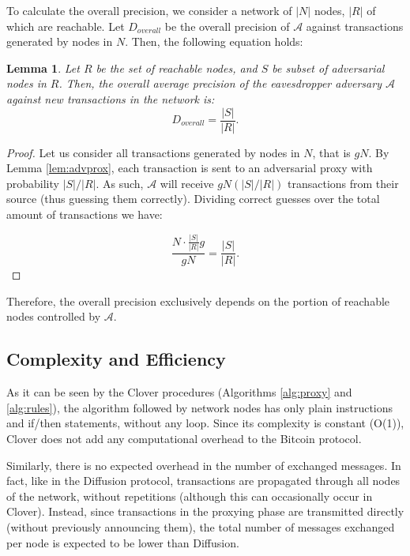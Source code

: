\documentclass{article}
\newtheorem{lemm}{Lemma}
\begin{document}
	
	To calculate the overall precision, we consider a network of $|N|$ nodes, $|R|$ of which are reachable.
	Let $D_{overall}$ be the overall precision of $\mathcal{A}$ against transactions generated by nodes in $N$. Then, the following equation holds:
	\begin{lemm}
		Let $R$ be the set of reachable nodes, and $S$ be subset of adversarial nodes in $R$.
		Then, the overall average precision of the eavesdropper adversary $\mathcal{A}$ against new transactions in the network is:
		\begin{equation}
			D_{overall} = \frac{|S|}{|R|}.
		\end{equation}
	\end{lemm}
	\begin{proof}
		Let us consider all transactions generated by nodes in $N$, that is $gN$.
		By Lemma \ref{lem:advprox}, each transaction is sent to an adversarial proxy with probability $|S|/|R|$.
		As such, $\mathcal{A}$ will receive $gN(|S|/|R|)$ transactions from their source (thus guessing them correctly).
		Dividing correct guesses over the total amount of transactions we have:
		
		\begin{equation}
			\frac{N\cdot\frac{|S|}{|R|}g}{gN} =  \frac{|S|}{|R|}.
		\end{equation}
	\end{proof}
	Therefore, the overall precision exclusively depends on the portion of reachable nodes controlled by $\mathcal{A}$.
	
	\subsection{Complexity and Efficiency}
	As it can be seen by the Clover procedures (Algorithms \ref{alg:proxy} and \ref{alg:rules}), the algorithm followed by network nodes has only plain instructions and if/then statements, without any loop.
	Since its complexity is constant (O(1)), Clover does not add any computational overhead to the Bitcoin protocol.
	
	Similarly, there is no expected overhead in the number of exchanged messages.
	In fact, like in the Diffusion protocol, transactions are propagated through all nodes of the network, without repetitions (although this can occasionally occur in Clover).
	Instead, since transactions in the proxying phase are transmitted directly (without previously announcing them), the total number of messages exchanged per node is expected to be lower than Diffusion.
	
\end{document}
